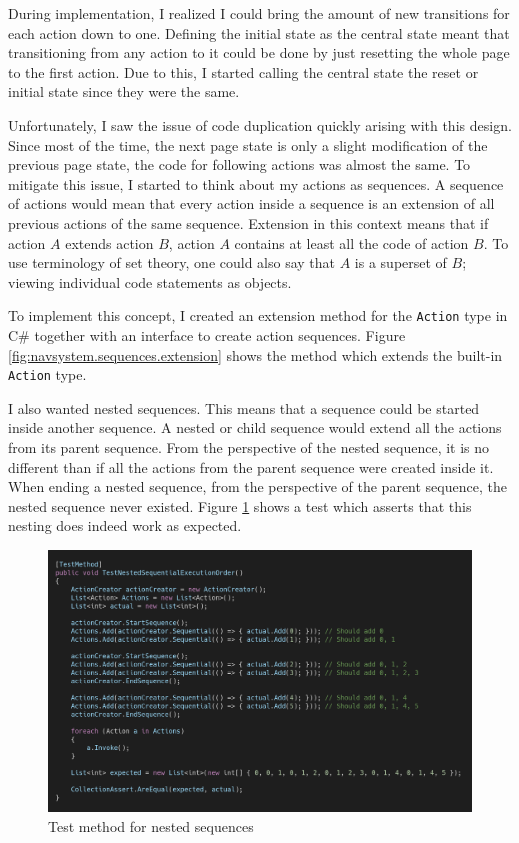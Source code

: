 During implementation, I realized I could bring the amount of new transitions for each action down to one. Defining the initial state as the central state meant that transitioning from any action to it could be done by just resetting the whole page to the first action. Due to this, I started calling the central state the reset or initial state since they were the same.

Unfortunately, I saw the issue of code duplication quickly arising with this design. Since most of the time, the next page state is only a slight modification of the previous page state, the code for following actions was almost the same. To mitigate this issue, I started to think about my actions as sequences. A sequence of actions would mean that every action inside a sequence is an extension of all previous actions of the same sequence. Extension in this context means that if action $A$ extends action $B$, action $A$ contains at least all the code of action $B$. To use terminology of set theory, one could also say that $A$ is a superset of $B$; viewing individual code statements as objects.

To implement this concept, I created an extension method for the \texttt{Action} type in C\# together with an interface to create action sequences. Figure \ref{fig:navsystem.sequences.extension} shows the method which extends the built-in \texttt{Action} type.

I also wanted nested sequences. This means that a sequence could be started inside another sequence. A nested or child sequence would extend all the actions from its parent sequence. From the perspective of the nested sequence, it is no different than if all the actions from the parent sequence were created inside it. When ending a nested sequence, from the perspective of the parent sequence, the nested sequence never existed. Figure \ref{fig:navsystem.test} shows a test which asserts that this nesting does indeed work as expected.
\begin{figure}
\centering
\includegraphics[width=\textwidth]{figures/code/nav-arch/TestNestedSequentialExecutionOrder.png}
\caption{Test method for nested sequences}
\label{fig:navsystem.test}
\end{figure}

